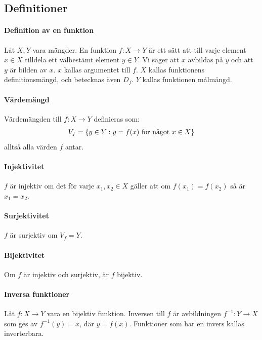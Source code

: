 \subsection{Definitioner}

\paragraph{Definition av en funktion}

Låt $X, Y$ vara mängder. En funktion $f: X\to Y$ är ett sätt att till varje element $x \in X$ tilldela ett välbestämt element $y\in Y$. Vi säger att $x$ avbildas på $y$ och att $y$ är bilden av $x$. $x$ kallas argumentet till $f$. $X$ kallas funktionens definitionsmängd, och betecknas även $D_f$. $Y$ kallas funktionen målmängd.

\paragraph{Värdemängd}

Värdemängden till $f: X\rightarrow Y$ definieras som:
\begin{align}
	V_f=\left \{y\in Y: y=f(x)\textnormal{ för något }x\in X\right \}\nonumber
\end{align}
alltså alla värden $f$ antar.

\paragraph{Injektivitet}

$f$ är injektiv om det för varje $x_1, x_2 \in X$ gäller att om $f(x_1)=f(x_2)$ så är $x_1=x_2$.

\paragraph{Surjektivitet}

$f$ är surjektiv om $V_f=Y$.

\paragraph{Bijektivitet}

Om $f$ är injektiv och surjektiv, är $f$ bijektiv.

\paragraph{Inversa funktioner}

Låt $f: X \to Y$ vara en bijektiv funktion. Inversen till $f$ är avbildningen $f^{-1}: Y\to X$ som ges av $f^{-1}(y)=x$, där $y=f(x)$. Funktioner som har en invers kallas inverterbara.

